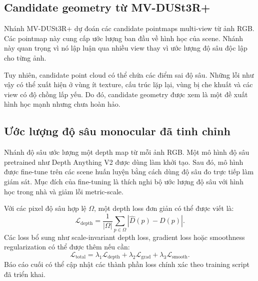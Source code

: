\documentclass[12pt,a4paper]{article}
\newcommand{\mvdp}{MV-DUSt3R+}
\newcommand{\da}{Depth Anything V2}
\begin{document}
\subsection{Candidate geometry từ MV-DUSt3R+}
Nhánh \mvdp{} dự đoán các candidate pointmaps multi-view từ ảnh RGB. Các pointmap này cung cấp ước lượng ban đầu về hình học của scene. Nhánh này quan trọng vì nó lập luận qua nhiều view thay vì ước lượng độ sâu độc lập cho từng ảnh.

Tuy nhiên, candidate point cloud có thể chứa các điểm sai độ sâu. Những lỗi như vậy có thể xuất hiện ở vùng ít texture, cấu trúc lặp lại, vùng bị che khuất và các view có độ chồng lấp yếu. Do đó, candidate geometry được xem là một đề xuất hình học mạnh nhưng chưa hoàn hảo.

\subsection{Ước lượng độ sâu monocular đã tinh chỉnh}
Nhánh độ sâu ước lượng một depth map từ mỗi ảnh RGB. Một mô hình độ sâu pretrained như \da{} được dùng làm khởi tạo. Sau đó, mô hình được fine-tune trên các scene huấn luyện bằng cách dùng độ sâu đo trực tiếp làm giám sát. Mục đích của fine-tuning là thích nghi bộ ước lượng độ sâu với hình học trong nhà và giảm lỗi metric-scale.

Với các pixel độ sâu hợp lệ $\Omega$, một depth loss đơn giản có thể được viết là:
\begin{equation}
\mathcal{L}_{\text{depth}} = \frac{1}{|\Omega|}\sum_{p\in\Omega}|\hat{D}(p)-D(p)|.
\end{equation}
Các loss bổ sung như scale-invariant depth loss, gradient loss hoặc smoothness regularization có thể được thêm nếu cần:
\begin{equation}
\mathcal{L}_{\text{total}} = \lambda_1\mathcal{L}_{\text{depth}} + \lambda_2\mathcal{L}_{\text{grad}} + \lambda_3\mathcal{L}_{\text{smooth}}.
\end{equation}
Báo cáo cuối có thể cập nhật các thành phần loss chính xác theo training script đã triển khai.
\end{document}
